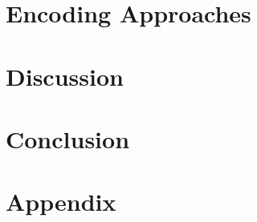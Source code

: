 \documentclass {article}
\begin{document}
\section {Encoding Approaches}

\section {Discussion}

\section {Conclusion}

\section {Appendix}
\end{document}
